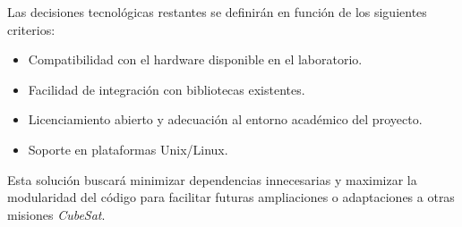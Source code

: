 Las decisiones tecnológicas restantes se definirán en función de los siguientes criterios:

\begin{itemize}
    \item Compatibilidad con el hardware disponible en el laboratorio.
    \item Facilidad de integración con bibliotecas existentes.
    \item Licenciamiento abierto y adecuación al entorno académico del proyecto.
    \item Soporte en plataformas Unix/Linux.
\end{itemize}

Esta solución buscará minimizar dependencias innecesarias y maximizar la modularidad del código para facilitar futuras ampliaciones o adaptaciones a otras misiones \textit{CubeSat}.
